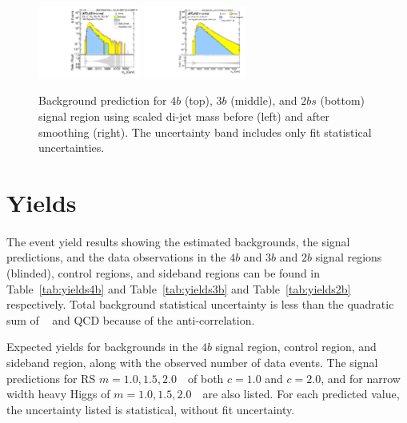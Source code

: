 \begin{figure}[htbp!]
\begin{center}
\includegraphics[width=0.3\textwidth,angle=-90]{figures/boosted/Signal/b77_TwoTag_split_Signal_mHH_pole_1_blind.pdf}
\includegraphics[width=0.3\textwidth,angle=-90]{figures/boosted/Smooth/Moriond_bkg_9_TwoTag_split_pole_Signal_mHH_pole_1_blind.pdf}
\end{center}
\caption{Background prediction for $4b$ (top), $3b$ (middle), and $2bs$ (bottom) signal region using scaled di-jet mass before (left) and after smoothing (right). The uncertainty band includes only fit statistical uncertainties.}
\label{fig:signal-region-mjjscaled-smooth-bkg-noSYS}
\end{figure}

\section{Yields}
\label{sec:yields}
\paragraph{}
The event yield results showing the estimated backgrounds, the signal predictions, and the data observations in the $4b$ and $3b$ and $2b$ signal regions (blinded), control regions, and sideband regions can be found in Table~\ref{tab:yields4b} and Table~\ref{tab:yields3b} and Table~\ref{tab:yields2b} respectively. Total background statistical uncertainty is less than the quadratic sum of \ttbar~ and QCD because of the anti-correlation.


\begin{table}[htbp!]
\footnotesize
\begin{center}
\caption{Expected yields for backgrounds in the $4b$ signal region, control region, and sideband region, along with the observed number of data events.  The signal predictions for RS $m=1.0, 1.5, 2.0$~\TeV\ of both $c=1.0$ and $c=2.0$, and for narrow width heavy Higgs of $m=1.0, 1.5, 2.0$~\TeV\ are also listed.  For each predicted value, the uncertainty listed is statistical, without fit uncertainty.}

\label{tab:yields4b}
\end{center}
\end{table}


